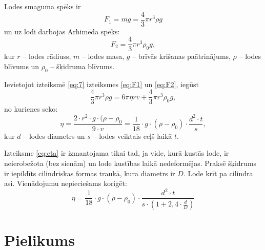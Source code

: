\documentclass[a4paper]{article}
\begin{document}
Lodes smaguma spēks ir
\begin{equation}\label{eq:F1}
    F_1 = mg = \frac{4}{3}\pi r^3 \rho g 
\end{equation}
un uz lodi darbojas Arhimēda spēks:
\begin{equation}\label{eq:F2}
    F_2 = \frac{4}{3}\pi r^3 \rho_0 g ,
\end{equation}
kur \( r \) -- lodes rādiuss, \(m\) -- lodes masa, \(g\) -- brīvās krišanas paātrinājums, \(\rho\) -- lodes blīvums un \(\rho_0\) -- šķidruma blīvums.

Ievietojot izteiksmē \ref{eq:7} izteiksmes \ref{eq:F1} un \ref{eq:F2}, iegūst
\begin{equation*}
    \frac{4}{3}\pi r^3 \rho g = 6\pi \eta r v + \frac{4}{3}\pi r^3 \rho_0 g,
\end{equation*}
no kurienes seko:
\begin{equation}\label{eq:eta}
    \eta = \frac{2 \cdot r^2 \cdot g \cdot (\rho - \rho_0}{9 \cdot v} = \frac{1}{18}\cdot g \cdot (\rho-\rho_0)\cdot \frac{d^2\cdot t}{s},
\end{equation}
kur \(d\) -- lodes diametrs un \(s\) -- lodes veiktais ceļš laikā \(t\).

Izteiksme \ref{eq:eta} ir izmantojama tikai tad, ja vide, kurā kustās lode, ir neierobežota (bez sienām) un lode kustības laikā nedeformējas. Praksē šķidrums ir iepildīts cilindriskas formas traukā, kura diametrs ir \(D\). Lode krīt pa cilindra asi. Vienādojumu nepieciešams koriģēt:
\begin{equation}
    \eta = \frac{1}{18}\cdot g \cdot (\rho-\rho_0) \cdot \frac{d^2 \cdot t}{s \cdot (1 + 2,4 \cdot \frac{d}{D})}
\end{equation}

\printbibliography

\pagebreak

\section{Pielikums}
\end{document}
